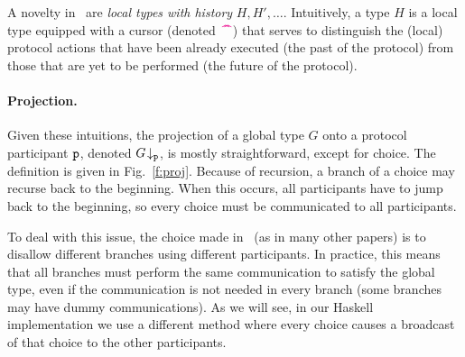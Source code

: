 \documentclass[runningheads,plain]{llncs}
\begin{document}
 A novelty in~\cite{DBLP:conf/ppdp/MezzinaP17} are \emph{local types with history}  $H, H', \ldots$. Intuitively, a type $H$ is a local type equipped with a
 cursor (denoted $\,\textcolor{magenta}{\text{\textbf{\textasciicircum\!\!\textasciicircum}}}$) that serves to distinguish  the (local) protocol actions  that have been already executed (the past of the protocol) from those that are yet to be performed (the future of the protocol).
 
 \paragraph{Projection.}
 Given these intuitions, the projection of a global type $G$ onto a protocol participant $\mathtt{p}$, denoted $G\!\downarrow_{\mathtt{p}}$,  is mostly straightforward, except for choice. 
 The   definition is given in Fig.~\ref{f:proj}.
 Because of recursion, a branch of a choice may recurse back to the beginning.
When this occurs, all participants have to jump back to the beginning,
so every choice must be communicated to all participants.

To deal with this issue, the choice made in~\cite{DBLP:conf/ppdp/MezzinaP17} (as in many other papers) is to disallow different branches using different participants. In practice, 
this means that all branches must perform the same communication to satisfy the global type, even if the communication is not needed in every branch (some branches may have dummy communications). As we will see, in our Haskell implementation we use a different method where every
choice causes a broadcast of that choice to the other participants. 
\end{document}
